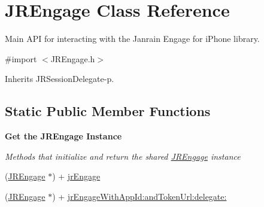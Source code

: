 \hypertarget{interface_j_r_engage}{
\section{JREngage Class Reference}
\label{interface_j_r_engage}
}


Main API for interacting with the Janrain Engage for iPhone library.  




{\ttfamily \#import $<$JREngage.h$>$}



Inherits JRSessionDelegate-\/p.

\subsection*{Static Public Member Functions}
\begin{Indent}{\bf Get the JREngage Instance}\par
{\em \label{_amgrp1563bd99b5767462283658c6804d90b3}
 Methods that initialize and return the shared \hyperlink{interface_j_r_engage}{JREngage} instance }\begin{DoxyCompactItemize}
\item 
(\hyperlink{interface_j_r_engage}{JREngage} $\ast$) + \hyperlink{interface_j_r_engage_adb6bf3a6869d83f2bfce0783f128d9e6}{jrEngage}
\item 
(\hyperlink{interface_j_r_engage}{JREngage} $\ast$) + \hyperlink{interface_j_r_engage_a36c199d6384893b1bf42712771af1e8b}{jrEngageWithAppId:andTokenUrl:delegate:}
\end{DoxyCompactItemize}
\end{Indent}
